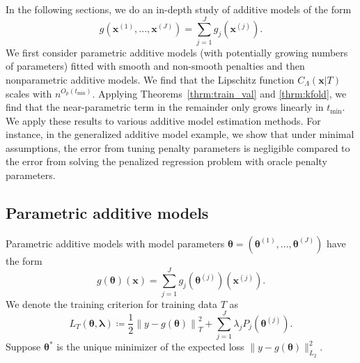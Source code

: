 \documentclass[12pt]{article} %
\theoremstyle{definition}
\begin{document}
In the following sections, we do an in-depth study of additive models of the form
\begin{equation}
g(\boldsymbol{x}^{(1)}, ..., \boldsymbol{x}^{(J)})= \sum_{j=1}^J g_j(\boldsymbol{x}^{(j)}).
\end{equation}
We first consider parametric additive models (with potentially growing numbers of parameters) fitted with smooth and non-smooth penalties and then nonparametric additive models.
We find that the Lipschitz function $C_\Lambda(\boldsymbol{x} | T)$ scales with $n^{O_p(t_{\min})}$.
Applying Theorems~\ref{thrm:train_val} and \ref{thrm:kfold}, we find that the near-parametric term in the remainder only grows linearly in $t_{\min}$.
We apply these results to various additive model estimation methods.
For instance, in the generalized additive model example, we show that under minimal assumptions, the error from tuning penalty parameters is negligible compared to the error from solving the penalized regression problem with oracle penalty parameters.

\subsection{Parametric additive models}
\label{sec:param_add_models}
Parametric additive models with model parameters $\boldsymbol{\theta} = \left (\boldsymbol{\theta}^{(1)}, ..., \boldsymbol{\theta}^{(J)} \right )$ have the form
\begin{equation}
g(\boldsymbol{\theta})(\boldsymbol{x})
= \sum_{j=1}^J g_j(\boldsymbol{\theta}^{(j)})(\boldsymbol{x}^{(j)}).
\end{equation}
We denote the training criterion for training data $T$ as
\begin{equation}
\label{eq:param_add}
L_T \left (\boldsymbol{\theta}, \boldsymbol{\lambda} \right) 
\coloneqq \frac{1}{2} \left  \| y -  g(\boldsymbol{\theta}) \right \|^2_T 
+ \sum_{j=1}^J \lambda_j P_j(\boldsymbol{\theta}^{(j)}).
\end{equation}
Suppose $\boldsymbol{\theta}^*$ is the unique minimizer of the expected loss $\| y - g(\boldsymbol{\theta}) \|^2_{L_2}$.
\end{document}
